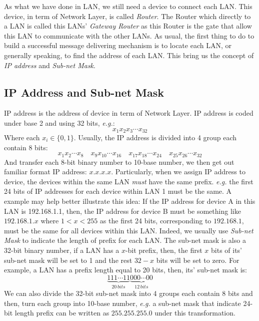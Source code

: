 \documentclass[10pt,a4paper]{article}
\begin{document}
As what we have done in LAN, we still need a device to connect each LAN. This device, in term of Network Layer, is called \textit{Router}. The Router which directly to a LAN is called this LANs' \textit{Gateway Router} as this Router is the gate that allow this LAN to communicate with the other LANs. As usual, the first thing to do to build a successful message delivering mechanism is to locate each LAN, or generally speaking, to find the address of each LAN. This bring us the concept of \textit{IP address} and \textit{Sub-net Mask}.

\subsection{IP Address and Sub-net Mask}
IP address is the address of device in term of Network Layer. IP address is coded under base 2 and using 32 bits, \textsl{e.g.}:
\begin{equation*}
	x_{1} x_{2} x_{3} \cdots x_{32}
\end{equation*}
Where each $x_{i} \in \{ 0, 1 \}$. Usually, the IP address is divided into 4 group each contain 8 bits:
\begin{equation*}
	x_{1} x_{2} \cdots x_{8} \quad x_{9} x_{10} \cdots x_{16} \quad x_{17} x_{18} \cdots x_{24} \quad x_{25} x_{26} \cdots x_{32}
\end{equation*}
And transfer each 8-bit binary number to 10-base number, we then get out familiar format IP address: $x.x.x.x$. Particularly, when we assign IP address to device, the devices within the same LAN \textit{must} have the same prefix. \textsl{e.g.} the first 24 bits of IP addresses for each device within LAN 1 must be the same. A example may help better illustrate this idea: If the IP address for device A in this LAN is 192.168.1.1, then, the IP address for device B must be something like $192.168.1.x$ where $1 < x < 255$ as the first 24 bits, corresponding to $192.168.1$, must be the same for all devices within this LAN. Indeed, we usually use \textit{Sub-net Mask} to indicate the length of prefix for each LAN. The sub-net mask is also a 32-bit binary number, if a LAN has a $x$-bit prefix, then, the first $x$ bits of its' sub-net mask will be set to 1 and the rest $32-x$ bits will be set to zero. For example, a LAN has a prefix length equal to 20 bits, then, its' sub-net mask is:
\begin{equation*}
	\underbrace{111 \cdots 11}_{20 \, bits}\underbrace{000 \cdots 00}_{12 \, bits}
\end{equation*}
We can also divide the 32-bit sub-net mask into 4 groups each contain 8 bits and then, turn each group into 10-base number, \textsl{e.g.} a sub-net mask that indicate 24-bit length prefix can be written as $255.255.255.0$ under this transformation.
\end{document}
